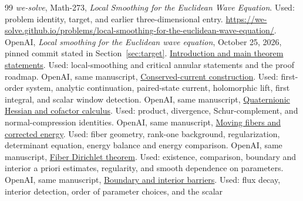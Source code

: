 \documentclass[11pt,a4paper]{article}
\numberwithin{equation}{section}
\theoremstyle{definition}
\theoremstyle{remark}
\begin{document}
\begin{thebibliography}{99}
 \emph{we-solve}, Math-273, \emph{Local Smoothing for the
Euclidean Wave Equation}. Used: problem identity, target, and earlier
three-dimensional entry. \url{https://we-solve.github.io/problems/local-smoothing-for-the-euclidean-wave-equation/}.
 OpenAI, \emph{Local smoothing for the Euclidean wave equation},
October 25, 2026, pinned commit stated in Section~\ref{sec:target}.
\href{https://github.com/openai/math/blob/7ef5c0cc5ca4b0e072b7a050fca09ab24bc6fa3a/preprints/Local-smoothing-for-the-Euclidean-wave-equation-October-25-2026/build/sections/introduction.tex}{Introduction and main theorem statements}.
Used: local-smoothing and critical annular statements and the proof roadmap.
 OpenAI, same manuscript,
\href{https://github.com/openai/math/blob/7ef5c0cc5ca4b0e072b7a050fca09ab24bc6fa3a/preprints/Local-smoothing-for-the-Euclidean-wave-equation-October-25-2026/build/sections/current.tex}{Conserved-current construction}.
Used: first-order system, analytic continuation, paired-state current,
holomorphic lift, first integral, and scalar window detection.
 OpenAI, same manuscript,
\href{https://github.com/openai/math/blob/7ef5c0cc5ca4b0e072b7a050fca09ab24bc6fa3a/preprints/Local-smoothing-for-the-Euclidean-wave-equation-October-25-2026/build/sections/calculus.tex}{Quaternionic Hessian and cofactor calculus}.
Used: product, divergence, Schur-complement, and normal-compression identities.
 OpenAI, same manuscript,
\href{https://github.com/openai/math/blob/7ef5c0cc5ca4b0e072b7a050fca09ab24bc6fa3a/preprints/Local-smoothing-for-the-Euclidean-wave-equation-October-25-2026/build/sections/energy.tex}{Moving fibers and corrected energy}.
Used: fiber geometry, rank-one background, regularization, determinant equation,
energy balance and energy comparison.
 OpenAI, same manuscript,
\href{https://github.com/openai/math/blob/7ef5c0cc5ca4b0e072b7a050fca09ab24bc6fa3a/preprints/Local-smoothing-for-the-Euclidean-wave-equation-October-25-2026/build/sections/dirichlet.tex}{Fiber Dirichlet theorem}.
Used: existence, comparison, boundary and interior a priori estimates,
regularity, and smooth dependence on parameters.
 OpenAI, same manuscript,
\href{https://github.com/openai/math/blob/7ef5c0cc5ca4b0e072b7a050fca09ab24bc6fa3a/preprints/Local-smoothing-for-the-Euclidean-wave-equation-October-25-2026/build/sections/barrier.tex}{Boundary and interior barriers}.
Used: flux decay, interior detection, order of parameter choices, and the scalar

\end{thebibliography}
\end{document}

